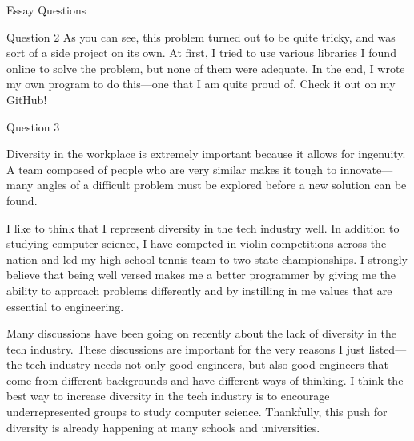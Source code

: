 \documentclass{resume} %
\begin{document}
\begin{rSection}{Essay Questions}
\begin{rSubsection}{Question 2}{}{}{}
    As you can see, this problem turned out to be quite tricky, and was sort of a side project
    on its own. At first, I tried to use various libraries I found online to solve the problem,
    but none of them were adequate. In the end, I wrote my own program to do this---one that I
    am quite proud of. Check it out on my GitHub!
   \end{rSubsection}

   \begin{rSubsection}{Question 3}{}{}{}
   \item Diversity in the workplace is extremely important because it allows for
     ingenuity. A team composed of people who are very similar makes it tough 
     to innovate---many angles of a difficult problem must be explored before a new 
     solution can be found.

     I like to think that I represent diversity in the tech industry well. In addition
     to studying computer science, I have competed in violin competitions across the
     nation and led my high school tennis team to two state championships. I strongly
     believe that being well versed makes me a better programmer by giving me the ability to
     approach problems differently and by instilling in me values that are essential
     to engineering.

     Many discussions have been going on recently about the lack of diversity in the
     tech industry. These discussions are important for the very reasons I just
     listed---the tech industry needs not only good engineers, but also good engineers
     that come from different backgrounds and have different ways of thinking. I think
     the best way to increase diversity in the tech industry is to encourage underrepresented
     groups to study computer science. Thankfully, this push for diversity is already happening at many
     schools and universities.

   \end{rSubsection}
  
\end{rSection}
        




\end{document}
